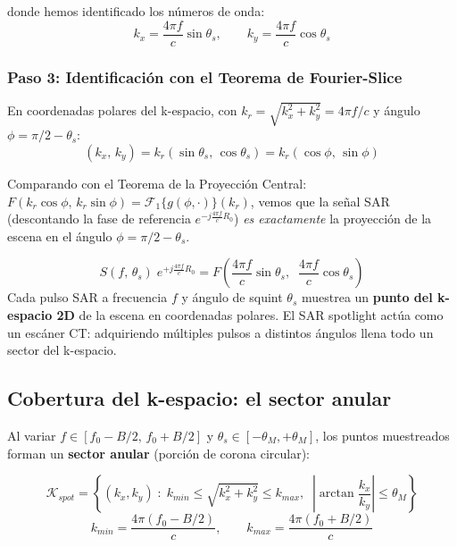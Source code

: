 \documentclass[12pt,a4paper,oneside]{book}
\newcommand{\result}[2]{%
  \begin{tcolorbox}[enhanced, breakable,
    colback=yellow!8, colframe=orange!70!black,
    fonttitle=\bfseries,
    title={\protect#1},
    attach boxed title to top left={yshift=-2mm, xshift=5mm},
    boxed title style={colback=orange!70!black}]
    #2
  \end{tcolorbox}}
\begin{document}
donde hemos identificado los números de onda:
\[
\boxed{k_x = \frac{4\pi f}{c}\sin\theta_s, \qquad k_y = \frac{4\pi f}{c}\cos\theta_s}
\]

\subsubsection{Paso 3: Identificación con el Teorema de Fourier-Slice}

En coordenadas polares del k-espacio, con $k_r = \sqrt{k_x^2+k_y^2} = 4\pi f/c$ y ángulo $\phi = \pi/2 - \theta_s$:
\[
(k_x,\,k_y) = k_r(\sin\theta_s,\,\cos\theta_s) = k_r(\cos\phi,\,\sin\phi)
\]

Comparando con el Teorema de la Proyección Central: $F(k_r\cos\phi,\,k_r\sin\phi) = \mathcal{F}_1\{g(\phi,\cdot)\}(k_r)$, vemos que la señal SAR (descontando la fase de referencia $e^{-j\frac{4\pi f}{c}R_0}$) \emph{es exactamente} la proyección de la escena en el ángulo $\phi=\pi/2-\theta_s$.

\result{Equivalencia de Munson et al.\ (1983)}{
\[
\boxed{S(f,\,\theta_s)\;e^{+j\frac{4\pi f}{c}R_0} = F\!\left(\frac{4\pi f}{c}\sin\theta_s,\;\;\frac{4\pi f}{c}\cos\theta_s\right)}
\]
Cada pulso SAR a frecuencia $f$ y ángulo de squint $\theta_s$ muestrea un \textbf{punto del k-espacio 2D} de la escena en coordenadas polares. El SAR spotlight actúa como un escáner CT: adquiriendo múltiples pulsos a distintos ángulos llena todo un sector del k-espacio.
}

\subsection{Cobertura del k-espacio: el sector anular}

Al variar $f\in[f_0-B/2,\,f_0+B/2]$ y $\theta_s\in[-\theta_M,+\theta_M]$, los puntos muestreados forman un \textbf{sector anular} (porción de corona circular):

\[
\mathcal{K}_{spot} = \left\{(k_x,k_y)\;:\;
  k_{min}\leq\sqrt{k_x^2+k_y^2}\leq k_{max},\;\;
  \left|\arctan\!\frac{k_x}{k_y}\right|\leq\theta_M
\right\}
\]
\[
k_{min}=\frac{4\pi(f_0-B/2)}{c}, \qquad k_{max}=\frac{4\pi(f_0+B/2)}{c}
\]
\end{document}

